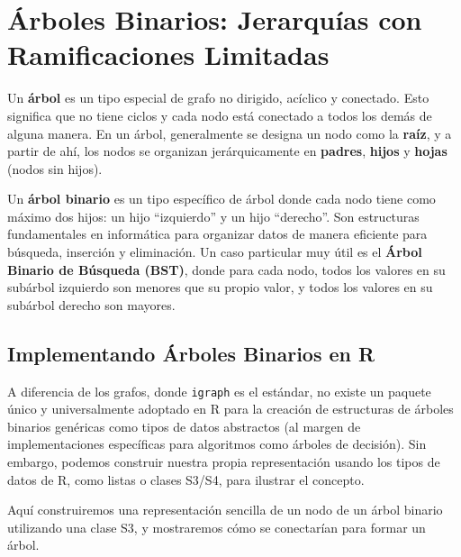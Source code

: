 \documentclass[
  spanish,
  letterpaper,
  DIV=11,
  numbers=noendperiod]{scrreprt}
\begin{document}
\section{Árboles Binarios: Jerarquías con Ramificaciones
Limitadas}\label{uxe1rboles-binarios-jerarquuxedas-con-ramificaciones-limitadas}

Un \textbf{árbol} es un tipo especial de grafo no dirigido, acíclico y
conectado. Esto significa que no tiene ciclos y cada nodo está conectado
a todos los demás de alguna manera. En un árbol, generalmente se designa
un nodo como la \textbf{raíz}, y a partir de ahí, los nodos se organizan
jerárquicamente en \textbf{padres}, \textbf{hijos} y \textbf{hojas}
(nodos sin hijos).

Un \textbf{árbol binario} es un tipo específico de árbol donde cada nodo
tiene como máximo dos hijos: un hijo ``izquierdo'' y un hijo
``derecho''. Son estructuras fundamentales en informática para organizar
datos de manera eficiente para búsqueda, inserción y eliminación. Un
caso particular muy útil es el \textbf{Árbol Binario de Búsqueda (BST)},
donde para cada nodo, todos los valores en su subárbol izquierdo son
menores que su propio valor, y todos los valores en su subárbol derecho
son mayores.

\subsection{Implementando Árboles Binarios en
R}\label{implementando-uxe1rboles-binarios-en-r}

A diferencia de los grafos, donde \texttt{igraph} es el estándar, no
existe un paquete único y universalmente adoptado en R para la creación
de estructuras de árboles binarios genéricas como tipos de datos
abstractos (al margen de implementaciones específicas para algoritmos
como árboles de decisión). Sin embargo, podemos construir nuestra propia
representación usando los tipos de datos de R, como listas o clases
S3/S4, para ilustrar el concepto.

Aquí construiremos una representación sencilla de un nodo de un árbol
binario utilizando una clase S3, y mostraremos cómo se conectarían para
formar un árbol.
\end{document}
